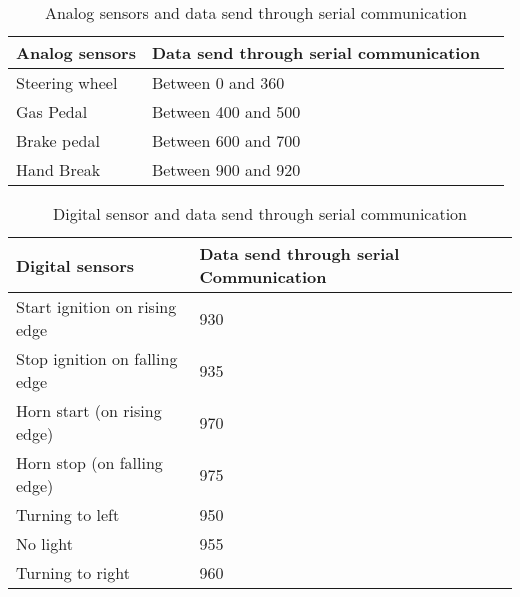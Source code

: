 \documentclass[12pt,a4paper]{article}
\begin{document}
\begin{center}
\begin{center}
\begin{center}
\begin{table}[H]
	\caption{Analog sensors and data send through serial communication}
	\vspace{0.3cm}
	\begin{tabular}{|l|l|l|}
		
		\hline
		\textbf {Analog sensors}& \textbf{Data send through serial communication}\\
		\hline
		Steering wheel & Between 0 and 360 \\ 
		\hline
		Gas Pedal & Between 400 and 500\\	
		\hline
		Brake pedal & Between 600 and 700 \\
		\hline
		Hand Break & Between 900 and 920\\
		\hline		
	\end{tabular}
\end{table}

\begin{table}[H]
\caption{Digital sensor and data send through serial communication}
\vspace{0.3cm}
\begin{tabular}{|l|l|l|}

   \hline
   	\textbf {Digital sensors}& \textbf{Data send through serial Communication}\\
   	\hline
   	Start ignition on rising edge & 930 \\ 
   	\hline
   	Stop ignition on falling edge & 935\\	
   	\hline
   	Horn start (on rising edge) & 970\\
   	\hline
   	Horn stop (on falling edge) & 975\\
   	\hline	
   	Turning to left & 950\\
   	\hline
   	No light & 955\\
   	\hline
   	Turning to right & 960\\
   	\hline	
   	\end{tabular}
   	\end{table}



\end{center}
\end{center}
\end{center}
\end{document}
